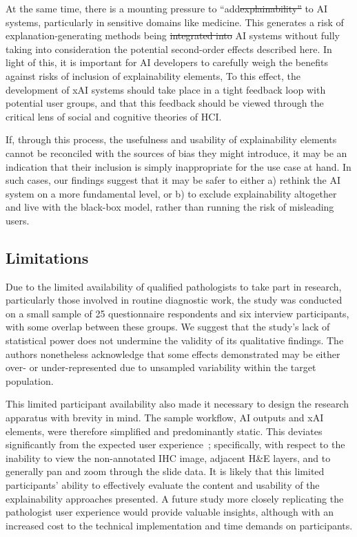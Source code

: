 \documentclass[final,5p,times,twocolumn,hyphens]{elsarticle}
\providecommand{\DIFaddtex}[1]{{\protect\color{blue}\uwave{#1}}} %
\providecommand{\DIFdeltex}[1]{{\protect\color{red}\sout{#1}}}                      %
\providecommand{\DIFaddbegin}{} %
\providecommand{\DIFaddend}{} %
\providecommand{\DIFdelbegin}{} %
\providecommand{\DIFdelend}{} %
\providecommand{\DIFadd}[1]{\texorpdfstring{\DIFaddtex{#1}}{#1}} %
\providecommand{\DIFdel}[1]{\texorpdfstring{\DIFdeltex{#1}}{}} %
\newcommand{\DIFscaledelfig}{0.5}
\newlength{\DIFdelgraphicswidth} %
\newlength{\DIFdelgraphicsheight} %
\newcommand{\DIFaddincludegraphics}[2][]{{\color{blue}\fbox{\DIFOincludegraphics[#1]{#2}}}} %
\newcommand{\DIFdelincludegraphics}[2][]{%
\sbox{\DIFdelgraphicsbox}{\DIFOincludegraphics[#1]{#2}}%
\settoboxwidth{\DIFdelgraphicswidth}{\DIFdelgraphicsbox} %
\settoboxtotalheight{\DIFdelgraphicsheight}{\DIFdelgraphicsbox} %
\scalebox{\DIFscaledelfig}{%
\parbox[b]{\DIFdelgraphicswidth}{\usebox{\DIFdelgraphicsbox}\\[-\baselineskip] \rule{\DIFdelgraphicswidth}{0em}}\llap{\resizebox{\DIFdelgraphicswidth}{\DIFdelgraphicsheight}{%
\setlength{\unitlength}{\DIFdelgraphicswidth}%
\begin{picture}(1,1)%
\thicklines\linethickness{2pt} %
{\color[rgb]{1,0,0}\put(0,0){\framebox(1,1){}}}%
{\color[rgb]{1,0,0}\put(0,0){\line( 1,1){1}}}%
{\color[rgb]{1,0,0}\put(0,1){\line(1,-1){1}}}%
\end{picture}%
}\hspace*{3pt}}} %
} %
\DeclareRobustCommand{\DIFaddbegin}{\DIFOaddbegin \let\includegraphics\DIFaddincludegraphics} %
\DeclareRobustCommand{\DIFaddend}{\DIFOaddend \let\includegraphics\DIFOincludegraphics} %
\DeclareRobustCommand{\DIFdelbegin}{\DIFOdelbegin \let\includegraphics\DIFdelincludegraphics} %
\DeclareRobustCommand{\DIFdelend}{\DIFOaddend \let\includegraphics\DIFOincludegraphics} %
\begin{document}
At the same time, there is a mounting pressure to ``add\DIFdelbegin \DIFdel{explainability'' }\DIFdelend \DIFaddbegin \DIFadd{'' explainability }\DIFaddend to AI systems, particularly in sensitive domains like medicine. This generates a risk of explanation-generating methods being \DIFdelbegin \DIFdel{integrated into }\DIFdelend \DIFaddbegin \DIFadd{applied to }\DIFaddend AI systems without fully taking into consideration the potential second-order effects described here. In light of this, it is important for AI developers to carefully weigh the benefits against risks of inclusion of explainability elements, To this effect, the development of xAI systems should take place in a tight feedback loop with potential user groups, and that this feedback should be viewed through the critical lens of social and cognitive theories of HCI.

If, through this process, the usefulness and usability of explainability elements cannot be reconciled with the sources of bias they might introduce, it may be an indication that their inclusion is simply inappropriate for the use case at hand. In such cases, our findings suggest that it may be safer to either a) rethink the AI system on a more fundamental level, or b) to exclude explainability altogether and live with the \DIFaddbegin \DIFadd{limited transparency of a }\DIFaddend black-box model, rather than running the risk of misleading users.

\subsection{Limitations}

Due to the limited availability of qualified pathologists to take part in research, particularly those involved in routine diagnostic work, the study was conducted on a small sample of 25 questionnaire respondents and six interview participants, with some overlap between these groups. We suggest that the study's lack of statistical power does not undermine the validity of its qualitative findings. The authors nonetheless acknowledge that some effects demonstrated may be either over- or under-represented due to unsampled variability within the target population. 

This limited participant availability also made it necessary to design the research apparatus with brevity in mind. The sample workflow, AI outputs and xAI elements, were therefore simplified and predominantly static. This deviates significantly from the expected user experience~\cite{Kargl-et-al:2020:PathoWorkflows}; specifically, with respect to the inability to view the non-annotated IHC image, adjacent H\&E layers, and to generally pan and zoom through the slide data. It is likely that this limited participants' ability to effectively evaluate the content and usability of the explainability approaches presented. A future study more closely replicating the pathologist user experience would provide valuable insights, although with an increased cost to the technical implementation and time demands on participants.
\end{document}
